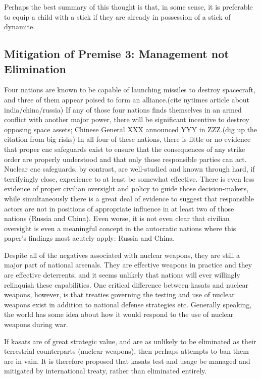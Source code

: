 Perhaps the best summary of this thought is that, in some sense, it is
preferable to equip a child with a stick if they are already in
possession of a stick of dynamite.


\subsection{Mitigation of Premise 3: Management not Elimination}
Four nations are known to be capable of launching missiles to destroy
spacecraft, and three of them appear poised to form an alliance.(cite
nytimes article about india/china/russia) If any of those four nations
finds themselves in an armed conflict with another major power, there
will be significant incentive to destroy opposing space assets;
Chinese General XXX announced YYY in ZZZ.(dig up the citation from big
risks) In all four of these nations, there is little or no evidence
that proper \ac{cnc} safeguards exist to ensure that the consequences
of any strike order are properly understood and that only those
responsible parties can act.  Nuclear \ac{cnc} safeguards, by
contrast, are well-studied and known through hard, if terrifyingly
close, experience to at least be somewhat effective.\cite[ask foster
  for a recommendation]{xxx} There is even less evidence of proper
civilian oversight and policy to guide those decision-makers, while
simultaneously there is a great deal of evidence to suggest that
responsible actors are not in positions of appropriate influence in at
least two of those nations (Russia and China).  Even worse, it is not
even clear that civilian oversight is even a meaningful concept in the
autocratic nations where this paper's findings most acutely apply:
Russia and China.\cite{dictator}

Despite all of the negatives associated with nuclear weapons, they are
still a major part of national arsenals.  They are effective weapons
in practice\cite[hiroshima]{xxx} and they are effective
deterrents\cite[mad]{xxx}, and it seems unlikely that nations will
ever willingly relinquish these capabilities.  One critical difference
between \acp{kasat} and nuclear weapons, however, is that treaties
governing the testing and use of nuclear weapons exist in addition to
national defense strategies etc.  Generally speaking, the world has
some idea about how it would respond to the use of nuclear weapons
during war.  \cite[biden's statement]{xxx}

If \acp{kasat} are of great strategic value, and are as unlikely to be
eliminated as their terrestrial counterparts (nuclear weapons), then
perhaps attempts to ban them are in vain.  It is therefore proposed
that \acp{kasat} test and usage be managed and mitigated by
international treaty, rather than eliminated entirely.

